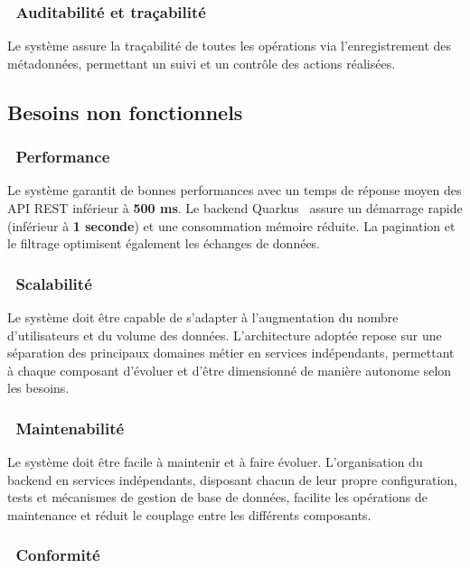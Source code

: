 \subsubsection*{~Auditabilité et traçabilité}

Le système assure la traçabilité de toutes les opérations via l'enregistrement des
métadonnées, permettant un suivi et un contrôle des actions réalisées.

\subsection{Besoins non fonctionnels}

\subsubsection*{~Performance}

Le système garantit de bonnes performances avec un temps de réponse moyen des API REST
inférieur à \textbf{500 ms}. Le backend Quarkus~\cite{QuarkusIO} assure un démarrage rapide
(inférieur à \textbf{1 seconde}) et une consommation mémoire réduite. La pagination et le
filtrage optimisent également les échanges de données.

\subsubsection*{~Scalabilité}

Le système doit être capable de s'adapter à l'augmentation du nombre d'utilisateurs et du
volume des données. L'architecture adoptée repose sur une séparation des principaux domaines
métier en services indépendants, permettant à chaque composant d'évoluer et d'être dimensionné
de manière autonome selon les besoins.

\subsubsection*{~Maintenabilité}

Le système doit être facile à maintenir et à faire évoluer. L'organisation du backend en
services indépendants, disposant chacun de leur propre configuration, tests et mécanismes de
gestion de base de données, facilite les opérations de maintenance et réduit le couplage entre
les différents composants.

\subsubsection*{~Conformité}

